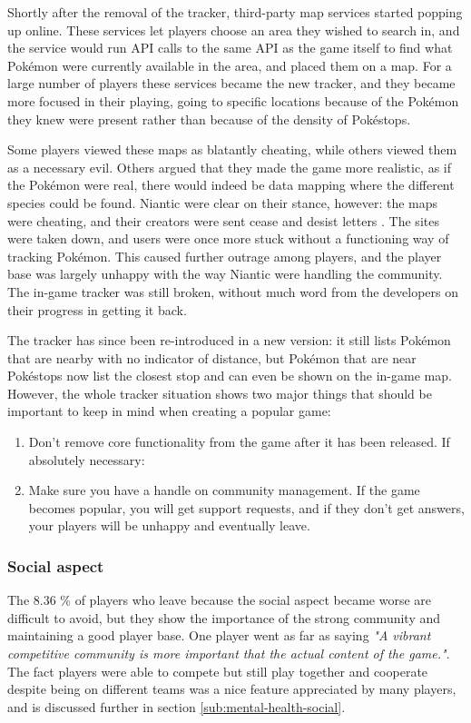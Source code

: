 Shortly after the removal of the tracker, third-party map services started popping up online. These services let players choose an area they wished to search in, and the service would run API calls to the same API as the game itself to find what Pokémon were currently available in the area, and placed them on a map. For a large number of players these services became the new tracker, and they became more focused in their playing, going to specific locations because of the Pokémon they knew were present rather than because of the density of Pokéstops.

Some players viewed these maps as blatantly cheating, while others viewed them as a necessary evil. Others argued that they made the game more realistic, as if the Pokémon were real, there would indeed be data mapping where the different species could be found. Niantic were clear on their stance, however: the maps were cheating, and their creators were sent cease and desist letters . The sites were taken down, and users were once more stuck without a functioning way of tracking Pokémon. This caused further outrage among players, and the player base was largely unhappy with the way Niantic were handling the community. The in-game tracker was still broken, without much word from the developers on their progress in getting it back.

The tracker has since been re-introduced in a new version: it still lists Pokémon that are nearby with no indicator of distance, but Pokémon that are near Pokéstops now list the closest stop and can even be shown on the in-game map. However, the whole tracker situation shows two major things that should be important to keep in mind when creating a popular game:

\begin{enumerate}
	\item Don't remove core functionality from the game after it has been released. If absolutely necessary:
	\item Make sure you have a handle on community management. If the game becomes popular, you will get support requests, and if they don't get answers, your players will be unhappy and eventually leave.
\end{enumerate}

\subsubsection{Social aspect}
The 8.36 \% of players who leave because the social aspect became worse are difficult to avoid, but they show the importance of the strong community and maintaining a good player base. One player went as far as saying \emph{"A vibrant competitive community is more important that the actual content of the game."}. The fact players were able to compete but still play together and cooperate despite being on different teams was a nice feature appreciated by many players, and is discussed further in section \ref{sub:mental-health-social}.

